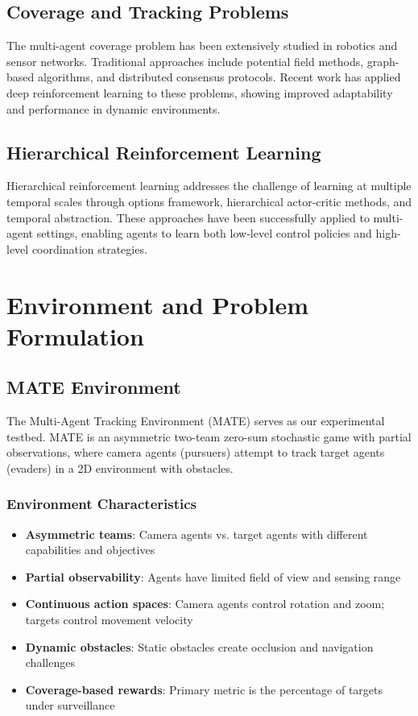 \documentclass[12pt,a4paper]{report}
\begin{document}
\section{Coverage and Tracking Problems}
The multi-agent coverage problem has been extensively studied in robotics and sensor networks. Traditional approaches include potential field methods, graph-based algorithms, and distributed consensus protocols. Recent work has applied deep reinforcement learning to these problems, showing improved adaptability and performance in dynamic environments.

\section{Hierarchical Reinforcement Learning}
Hierarchical reinforcement learning addresses the challenge of learning at multiple temporal scales through options framework, hierarchical actor-critic methods, and temporal abstraction. These approaches have been successfully applied to multi-agent settings, enabling agents to learn both low-level control policies and high-level coordination strategies.

\chapter{Environment and Problem Formulation}

\section{MATE Environment}
The Multi-Agent Tracking Environment (MATE) serves as our experimental testbed. MATE is an asymmetric two-team zero-sum stochastic game with partial observations, where camera agents (pursuers) attempt to track target agents (evaders) in a 2D environment with obstacles.

\subsection{Environment Characteristics}
\begin{itemize}
\item \textbf{Asymmetric teams}: Camera agents vs. target agents with different capabilities and objectives
\item \textbf{Partial observability}: Agents have limited field of view and sensing range
\item \textbf{Continuous action spaces}: Camera agents control rotation and zoom; targets control movement velocity
\item \textbf{Dynamic obstacles}: Static obstacles create occlusion and navigation challenges
\item \textbf{Coverage-based rewards}: Primary metric is the percentage of targets under surveillance
\end{itemize}
\end{document}
